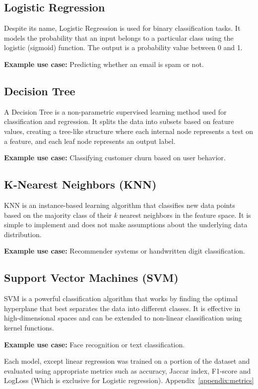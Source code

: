 \documentclass[12pt]{article}
\begin{document}
\subsection{Logistic Regression}
Despite its name, Logistic Regression is used for binary classification tasks. It models the probability that an input belongs to a particular class using the logistic (sigmoid) function. The output is a probability value between 0 and 1.

\textbf{Example use case:} Predicting whether an email is spam or not.

\subsection{Decision Tree}
A Decision Tree is a non-parametric supervised learning method used for classification and regression. It splits the data into subsets based on feature values, creating a tree-like structure where each internal node represents a test on a feature, and each leaf node represents an output label.

\textbf{Example use case:} Classifying customer churn based on user behavior.

\subsection{K-Nearest Neighbors (KNN)}
KNN is an instance-based learning algorithm that classifies new data points based on the majority class of their \textit{k} nearest neighbors in the feature space. It is simple to implement and does not make assumptions about the underlying data distribution.

\textbf{Example use case:} Recommender systems or handwritten digit classification.

\subsection{Support Vector Machines (SVM)}
SVM is a powerful classification algorithm that works by finding the optimal hyperplane that best separates the data into different classes. It is effective in high-dimensional spaces and can be extended to non-linear classification using kernel functions.

\textbf{Example use case:} Face recognition or text classification.

\begin{flushleft}
Each model, except linear regression was trained on a portion of the dataset and evaluated using appropriate metrics such as accuracy, Jaccar index, F1-score and LogLoss (Which is exclusive for Logistic regression). Appendix~\ref{appendix:metrics}
\end{flushleft}
\end{document}
